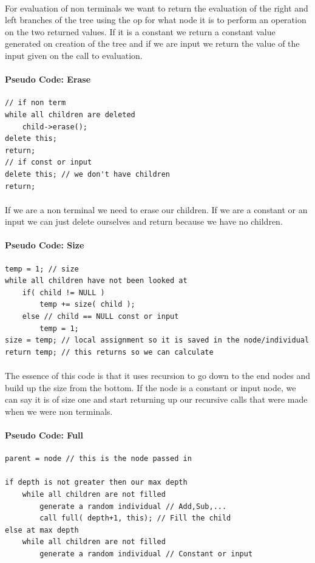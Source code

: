 \documentclass[paper=a4, fontsize=11pt]{scrartcl} %
\numberwithin{equation}{section} %
\numberwithin{figure}{section} %
\numberwithin{table}{section} %
\begin{document}
\paragraph{} For evaluation of non terminals we want to return the evaluation of the right and left branches of the tree using the op for what node it is to perform an operation on the two returned values. If it is a constant we return a constant value generated on creation of the tree and if we are input we return the value of the input given on the call to evaluation.

\paragraph{Pseudo Code: Erase}
\begin{verbatim}
// if non term
while all children are deleted
    child->erase();
delete this;
return;
// if const or input
delete this; // we don't have children
return;
\end{verbatim}

\paragraph{} If we are a non terminal we need to erase our children. If we are a constant or an input we can just delete ourselves and return because we have no children.

\paragraph{Pseudo Code: Size}
\begin{verbatim}
temp = 1; // size
while all children have not been looked at
    if( child != NULL )
        temp += size( child );
    else // child == NULL const or input
        temp = 1;
size = temp; // local assignment so it is saved in the node/individual
return temp; // this returns so we can calculate
\end{verbatim}

\paragraph{} The essence of this code is that it uses recursion to go down to the end nodes and build up the size from the bottom. If the node is a constant or input node, we can say it is of size one and start returning up our recursive calls that were made when we were non terminals.

\paragraph{Pseudo Code: Full}
\begin{verbatim}
parent = node // this is the node passed in

if depth is not greater then our max depth
    while all children are not filled
        generate a random individual // Add,Sub,...
        call full( depth+1, this); // Fill the child
else at max depth
    while all children are not filled
        generate a random individual // Constant or input
\end{verbatim}
\end{document}
